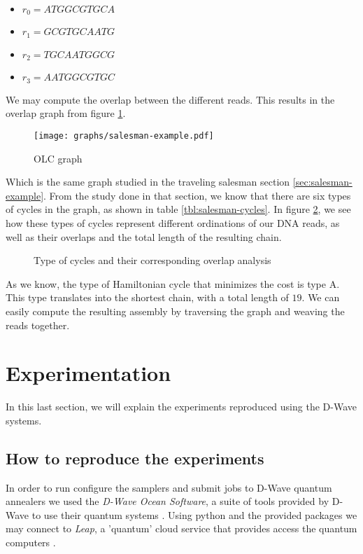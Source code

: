\begin{itemize}
	\item $r_0 = ATGGCGTGCA$
	\item $r_1 = GCGTGCAATG$
	\item $r_2 = TGCAATGGCG$
	\item $r_3 = AATGGCGTGC$
\end{itemize}

We may compute the overlap between the different reads. This results in the overlap graph from figure \ref{fig:overlap-graph}.

\begin{figure}[h]
	\texttt{[image: graphs/salesman-example.pdf]}
	\centering
	\caption{OLC graph}
	\label{fig:overlap-graph}
\end{figure}

Which is the same graph studied in the traveling salesman section \ref{sec:salesman-example}. From the study done in that section, we know that there are six types of cycles in the graph, as shown in table \ref{tbl:salesman-cycles}. In figure \ref{fig:overlap-cycles}, we see how these types of cycles represent different ordinations of our DNA reads, as well as their overlaps and the total length of the resulting chain.

\begin{figure}[h]
	\centering
	\caption{Type of cycles and their corresponding overlap analysis \cite{Sarkar2020}}
	\label{fig:overlap-cycles}
\end{figure}

As we know, the type of Hamiltonian cycle that minimizes the cost is type A. This type translates into the shortest chain, with a total length of $19$. We can easily compute the resulting assembly by traversing the graph and weaving the reads together.


\section{Experimentation}


In this last section, we will explain the experiments reproduced using the D-Wave systems.


\subsection{How to reproduce the experiments}


In order to run configure the samplers and submit jobs to D-Wave quantum annealers we used the \emph{D-Wave Ocean Software}, a suite of tools provided by D-Wave to use their quantum systems \cite{DWave-OceanDoc}. Using python and the provided packages we may connect to \emph{Leap}, a 'quantum' cloud service that provides access the quantum computers \cite{DWave-Leap}.

